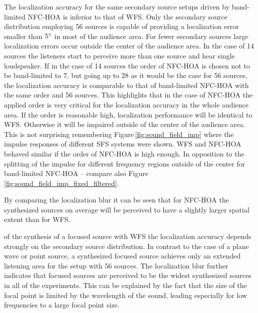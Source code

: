 The localization accuracy for the same secondary source setups driven by
band-limited \ac{NFC-HOA} is inferior to that of \ac{WFS}. Only the secondary source
distribution employing 56 sources is capable of providing a localization error
smaller than $5^\circ$ in most of the audience area. For fewer secondary
sources large localization errors occur outside the center of the audience
area. In the case of 14 sources the listeners start to perceive more than one
source and hear single loudspeaker.
If in the case of 14 sources the order of \ac{NFC-HOA} is chosen not to be
band-limited to $7$, but going up to $28$ as it would be the case for 56
sources, the localization accuracy is comparable to that of band-limited
\ac{NFC-HOA} with the same order and 56 sources. This highlights that in the
case of \ac{NFC-HOA} the applied order is very critical for the localization
accuracy in the whole audience area. If the order is reasonable high,
localization performance will be identical to \ac{WFS}. Otherwise it will be
impaired outside of the center of the audience area.
This is not surprising remembering Figure\,\ref{fig:sound_field_imp} where the
impulse responses of different \ac{SFS} systems were shown. \ac{WFS} and
\ac{NFC-HOA} behaved similar if the order of \ac{NFC-HOA} is high enough.
In opposition to the splitting of the impulse for different frequency regions
outside of the center for band-limited
\ac{NFC-HOA} -- compare also Figure\,\ref{fig:sound_field_imp_fixed_filtered}.

By comparing the localization blur it can be seen that for \ac{NFC-HOA} the
synthesized sources on average will be perceived to have a slightly larger spatial
extent than for \ac{WFS}.

 of the synthesis of a focused source with \ac{WFS} the
localization accuracy depends strongly on the secondary source distribution. In
contrast to the case of a plane wave or point source, a synthesized focused
source achieves only an extended listening area for the setup with 56 sources.
The localization blur further indicates that focused sources are perceived to be
the widest synthesized sources in all of the experiments. This can be explained
by the fact that the size of the focal point is limited by the wavelength of the
sound, leading especially for low frequencies to a large focal point size.


